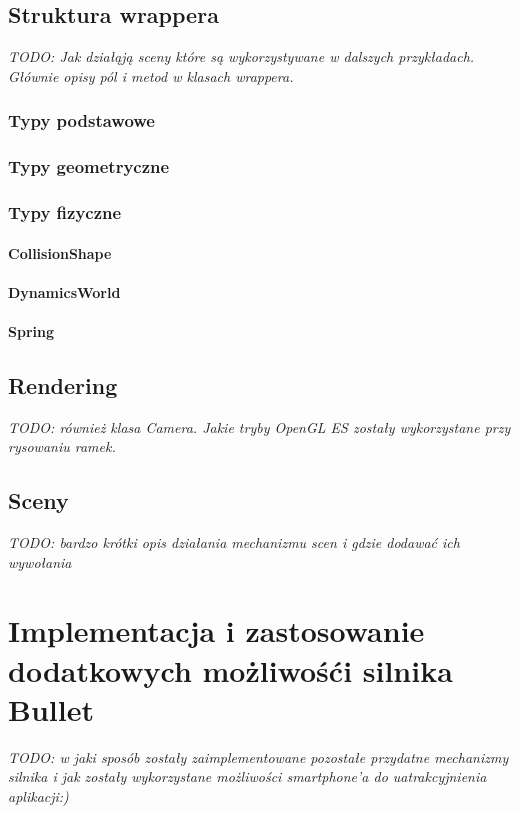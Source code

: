 \subsection{Struktura wrappera}
\emph{TODO: Jak działąją sceny które są wykorzystywane w dalszych przykładach.
Głównie opisy pól i metod w klasach wrappera.}

\subsubsection{Typy podstawowe}

\subsubsection{Typy geometryczne}

\subsubsection{Typy fizyczne}

\paragraph{CollisionShape}

\paragraph{DynamicsWorld}

\paragraph{Spring}

\subsection{Rendering}
\emph{TODO: również klasa Camera. Jakie tryby OpenGL ES zostały wykorzystane
przy rysowaniu ramek.}

\subsection{Sceny}
\emph{TODO: bardzo krótki opis działania mechanizmu scen i gdzie dodawać ich
wywołania}

\newpage
\section{Implementacja i zastosowanie dodatkowych możliwośći silnika Bullet}
\emph{TODO: w jaki sposób zostały zaimplementowane pozostałe przydatne
mechanizmy silnika i jak zostały wykorzystane możliwości smartphone'a do
uatrakcyjnienia aplikacji:)}

